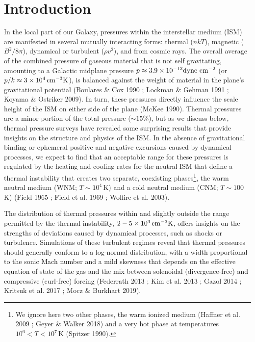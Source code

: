 \documentclass[modern]{aastex63}
\newcommand{\cmk}{\ensuremath{\,\rm{cm^{-3}K}}}
\begin{document}
\section{Introduction}\label{sec:intro}
In the local part of our Galaxy, pressures within the interstellar medium (ISM) are manifested in 
several mutually interacting forms: thermal ($nkT$), magnetic ($B^2/8\pi$), dynamical or 
turbulent ($\rho v^2$), and from cosmic rays.  The overall average of the combined pressure of 
gaseous material that is not self gravitating, amounting to a Galactic midplane pressure 
$p\approx 3.9\times 10^{-12} {\rm dyne~cm^{-2}}$ (or $p/k\approx 3\times 10^4\cmk$), is 
balanced against the weight of material in the plane’s gravitational potential (Boulares \& Cox 
1990 ; Lockman \& Gehman 1991 ; Koyama \& Ostriker 2009).  In turn, these pressures directly 
influence the scale height of the ISM on either side of the plane (McKee 1990).  Thermal 
pressures are a minor portion of the total pressure ($\sim 15\%$), but as we discuss below, 
thermal pressure surveys have revealed some surprising results that provide insights on the 
structure and physics of the ISM.  In the absence of gravitational binding or ephemeral positive 
and negative excursions caused by dynamical processes, we expect to find that an acceptable 
range for these pressures is regulated by the heating and cooling rates for the neutral ISM that 
define a thermal instability that creates two separate, coexisting phases\footnote{We ignore 
here two other phases, the warm ionized medium (Haffner et al. 2009 ; Geyer \& Walker 2018) 
and a very hot phase at temperatures $10^6 \lt T \lt 10^7$\,K (Spitzer 1990).}, the warm 
neutral medium (WNM; $T\sim 10^4$\,K) and a cold neutral medium (CNM; $T\sim 100$\,K) 
(Field 1965 ; Field et al. 1969 ; Wolfire et al. 2003).

The distribution of thermal pressures within and slightly outside the range permitted by the 
thermal instability, $2-5\times 10^3\cmk$, offers insights on the strengths of deviations caused 
by dynamical processes, such as shocks or turbulence.  Simulations of these turbulent regimes 
reveal that thermal pressures should generally conform to a log-normal distribution, with a 
width proportional to the sonic  Mach number and a mild skewness that depends on the 
effective equation of state of the gas and the mix between solenoidal (divergence-free) and 
compressive (curl-free) forcing (Federrath 2013 ; Kim et al. 2013 ; Gazol 2014 ; Kritsuk et al. 
2017 ; Mocz \& Burkhart 2019).   
\end{document}
